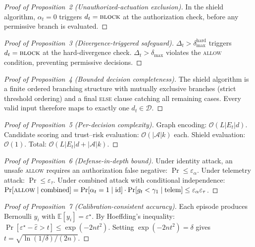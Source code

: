 \begin{proof}[Proof of Proposition~2 (Unauthorized-actuation exclusion)]
In the shield algorithm, $\alpha_t=0$ triggers $d_t=\textsc{block}$ at the authorization check, before any permissive branch is evaluated.
\end{proof}

\begin{proof}[Proof of Proposition~3 (Divergence-triggered safeguard)]
$\Delta_t > \delta_{\max}^{\mathrm{hard}}$ triggers $d_t=\textsc{block}$ at the hard-divergence check.
$\Delta_t > \delta_{\max}$ violates the \textsc{allow} condition, preventing permissive decisions.
\end{proof}

\begin{proof}[Proof of Proposition~4 (Bounded decision completeness)]
The shield algorithm is a finite ordered branching structure with mutually exclusive branches (strict threshold ordering) and a final \textsc{else} clause catching all remaining cases.
Every valid input therefore maps to exactly one $d_t \in \mathcal{D}$.
\end{proof}

\begin{proof}[Proof of Proposition~5 (Per-decision complexity)]
Graph encoding: $\mathcal{O}(L|E_t|d)$.
Candidate scoring and trust--risk evaluation: $\mathcal{O}(|\mathcal{A}|k)$ each.
Shield evaluation: $\mathcal{O}(1)$.
Total: $\mathcal{O}(L|E_t|d + |\mathcal{A}|k)$.
\end{proof}

\begin{proof}[Proof of Proposition~6 (Defense-in-depth bound)]
Under identity attack, an unsafe \textsc{allow} requires an authorization false negative: $\Pr \le \varepsilon_\alpha$.
Under telemetry attack: $\Pr \le \varepsilon_\tau$.
Under combined attack with conditional independence:
$\Pr[\textsc{allow} \mid \text{combined}] = \Pr[\alpha_t=1 \mid \text{id}] \cdot \Pr[g_t<\gamma_1 \mid \text{telem}] \le \varepsilon_\alpha \varepsilon_\tau$.
\end{proof}

\begin{proof}[Proof of Proposition~7 (Calibration-consistent accuracy)]
Each episode produces Bernoulli $y_i$ with $\mathbb{E}[y_i]=\varepsilon^\star$.
By Hoeffding's inequality: $\Pr[\varepsilon^\star - \hat\varepsilon > t] \le \exp(-2nt^2)$.
Setting $\exp(-2nt^2)=\delta$ gives $t=\sqrt{\ln(1/\delta)/(2n)}$.
\end{proof}

